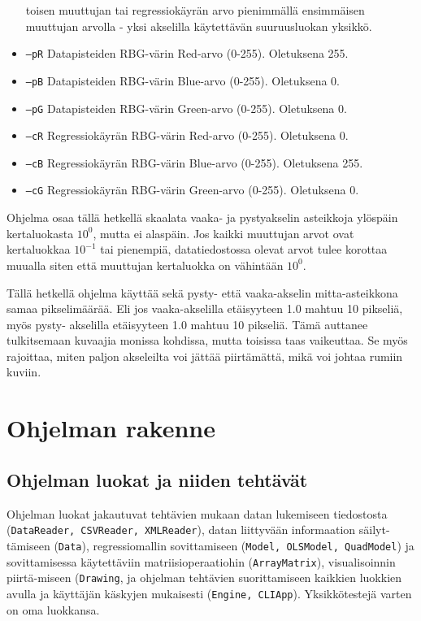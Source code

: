 \documentclass{article}
\begin{document}
\begin{itemize}
		toisen muuttujan tai regressiokäyrän arvo pienimmällä ensimmäisen muuttujan 
		arvolla - yksi akselilla käytettävän suuruusluokan yksikkö.
        \item \texttt{--pR} Datapisteiden RBG-värin Red-arvo (0-255). Oletuksena 255.
        \item \texttt{--pB} Datapisteiden RBG-värin Blue-arvo (0-255). Oletuksena 0.
        \item \texttt{--pG} Datapisteiden RBG-värin Green-arvo (0-255). Oletuksena 0.
        \item \texttt{--cR} Regressiokäyrän RBG-värin Red-arvo (0-255). Oletuksena 0.
        \item \texttt{--cB} Regressiokäyrän RBG-värin Blue-arvo (0-255). Oletuksena 255.
        \item \texttt{--cG} Regressiokäyrän RBG-värin Green-arvo (0-255). Oletuksena 0.
        
    \end{itemize}
    
	Ohjelma osaa tällä hetkellä skaalata vaaka- ja pystyakselin asteikkoja ylöspäin 
	kertaluokasta \(10^0\),	mutta ei alaspäin. Jos kaikki muuttujan arvot ovat kertaluokkaa 
	\(10^{-1}\) tai pienempiä, datatiedostossa olevat arvot tulee korottaa muualla siten
	että muuttujan kertaluokka on vähintään \(10^0\).
	
	Tällä hetkellä ohjelma käyttää sekä pysty- että vaaka-akselin mitta-asteikkona samaa
	pikselimäärää. Eli jos vaaka-akselilla etäisyyteen 1.0 mahtuu 10 pikseliä, myös pysty-
	akselilla etäisyyteen 1.0 mahtuu 10 pikseliä. Tämä auttanee tulkitsemaan kuvaajia
	monissa kohdissa, mutta toisissa taas vaikeuttaa. Se myös rajoittaa, miten paljon
	akseleilta voi jättää piirtämättä, mikä voi johtaa rumiin kuviin.

\section{Ohjelman rakenne}

    \subsection{Ohjelman luokat ja niiden tehtävät}
    Ohjelman luokat jakautuvat tehtävien mukaan datan lukemiseen tiedostosta 
	(\texttt{DataReader, CSVReader, XMLReader}), datan liittyvään informaation säilyt-
	tämiseen (\texttt{Data}), regressiomallin sovittamiseen (\texttt{Model, OLSModel, QuadModel}) 
	ja sovittamisessa käytettäviin matriisioperaatiohin 
	(\texttt{ArrayMatrix}), visualisoinnin piirtä-miseen (\texttt{Drawing}, ja ohjelman 
	tehtävien suorittamiseen kaikkien luokkien avulla ja käyttäjän käskyjen mukaisesti 
	(\texttt{Engine, CLIApp}). Yksikkötestejä varten on oma luokkansa.
    
\end{document}
